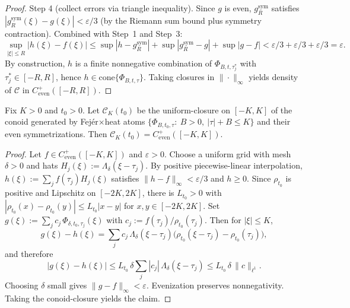 \begin{proof}
Step 4 (collect errors via triangle inequality). Since $g$ is even, $g_R^{\mathrm{sym}}$ satisfies $|g_R^{\mathrm{sym}}(\xi)-g(\xi)|<\varepsilon/3$ (by the Riemann sum bound plus symmetry contraction). Combined with Step~1 and Step~3:
\begin{equation}\label{eq:A1_local_density-formula}
\sup_{|\xi|\le R} |h(\xi)-f(\xi)| \le \sup|h-g_R^{\mathrm{sym}}| + \sup|g_R^{\mathrm{sym}}-g| + \sup|g-f| < \varepsilon/3+\varepsilon/3+\varepsilon/3 = \varepsilon.
\end{equation}
By construction, $h$ is a finite nonnegative combination of $\Phi_{B,t,\tau_j^*}$ with $\tau_j^*\in[-R,R]$, hence $h\in\mathrm{cone}\{\Phi_{B,t,\tau}\}$. Taking closures in $\|\cdot\|_\infty$ yields density of $\mathcal C$ in $C^+_{\mathrm{even}}([-R,R])$.
\end{proof}

\begin{lemma}\label{lem:a1-fixed-t-density}
Fix $K>0$ and $t_0>0$. Let $\mathcal C_K(t_0)$ be the uniform-closure on $[-K,K]$
of the conoid generated by Fej\'er$\times$heat atoms $\{\Phi_{B,t_0,\tau}:\ B>0,\ |\tau|+B\le K\}$
and their even symmetrizations. Then $\mathcal C_K(t_0)=C^+_{\mathrm{even}}([-K,K])$.
\label{a1:lem:A1-fix-t}
\end{lemma}
\begin{proof}
Let $f\in C^+_{\mathrm{even}}([-K,K])$ and $\varepsilon>0$. Choose a uniform grid with mesh $\delta>0$
and hats $H_j(\xi):=\Lambda_\delta(\xi-\tau_j)$. By positive piecewise-linear interpolation,
$h(\xi):=\sum_j f(\tau_j)H_j(\xi)$ satisfies $\|h-f\|_\infty<\varepsilon/3$ and $h\ge0$.
Since $\rho_{t_0}$ is positive and Lipschitz on $[-2K,2K]$, there is $L_{t_0}>0$ with
$|\rho_{t_0}(x)-\rho_{t_0}(y)|\le L_{t_0}|x-y|$ for $x,y\in[-2K,2K]$. Set
$g(\xi):=\sum_j c_j\,\Phi_{\delta,t_0,\tau_j}(\xi)$ with $c_j:=f(\tau_j)/\rho_{t_0}(\tau_j)$.
Then for $|\xi|\le K$,
\[
g(\xi)-h(\xi)=\sum_j c_j\,\Lambda_\delta(\xi-\tau_j)\bigl(\rho_{t_0}(\xi-\tau_j)-\rho_{t_0}(\tau_j)\bigr),
\]
and therefore
\[
|g(\xi)-h(\xi)|\le L_{t_0}\,\delta\sum_j |c_j|\,\Lambda_\delta(\xi-\tau_j)\le L_{t_0}\,\delta\,\|c\|_{\ell^1}.
\]
Choosing $\delta$ small gives $\|g-f\|_\infty<\varepsilon$. Evenization preserves nonnegativity. Taking the conoid-closure
yields the claim.
\end{proof}
